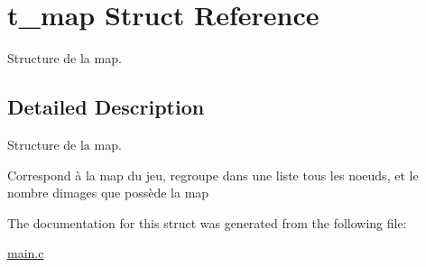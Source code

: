 \hypertarget{structt__map}{}\section{t\+\_\+map Struct Reference}
\label{structt__map}


Structure de la map.  




\subsection{Detailed Description}
Structure de la map. 

Correspond à la map du jeu, regroupe dans une liste tous les noeuds, et le nombre d\textquotesingle{}images que possède la map 

The documentation for this struct was generated from the following file\+:\begin{DoxyCompactItemize}
\item 
\hyperlink{main_8c}{main.\+c}\end{DoxyCompactItemize}
